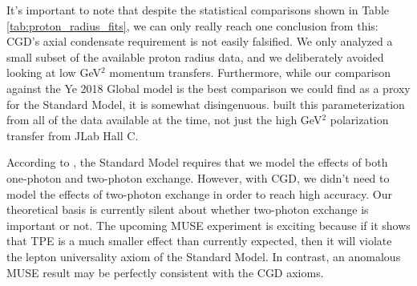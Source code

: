 It's important to note that despite the statistical comparisons shown in Table \ref{tab:proton_radius_fits}, we can only really reach one conclusion from this: CGD's axial condensate requirement is not easily falsified. We only analyzed a small subset of the available proton radius data, and we deliberately avoided looking at low GeV$^2$ momentum transfers. Furthermore, while our comparison against the Ye 2018 Global model is the best comparison we could find as a proxy for the Standard Model, it is somewhat disingenuous. \citet{ye2018proton} built this parameterization from all of the data available at the time, not just the high GeV$^2$ polarization transfer from JLab Hall C.

According to \citet{miller2026proton}, the Standard Model requires that we model the effects of both one-photon and two-photon exchange. However, with CGD, we didn't need to model the effects of two-photon exchange in order to reach high accuracy. Our theoretical basis is currently silent about whether two-photon exchange is important or not. The upcoming MUSE experiment \citet{cline2021muse} is exciting because if it shows that TPE is a much smaller effect than currently expected, then it will violate the lepton universality axiom of the Standard Model. In contrast, an anomalous MUSE result may be perfectly consistent with the CGD axioms.

